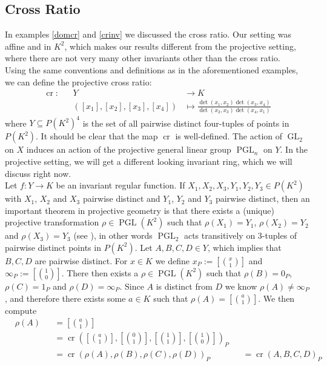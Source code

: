 \subsection{Cross Ratio}
In examples \ref{domcr} and \ref{crinv} we discussed the cross ratio.
Our setting was affine and in $K^2$, which makes our results different from the projective setting, where there are not very many other invariants other than the cross ratio.  \\
Using the same conventions and definitions as in the aforementioned examples, we can define the projective cross ratio:
\begin{equation}
  \begin{aligned}
    \operatorname{cr} \colon&&Y&\longrightarrow K \\
    &&([x_1],[x_2],[x_3],[x_4]) &\longmapsto \frac{\operatorname{det}(x_1,x_2)\operatorname{det}(x_3,x_4)}{\operatorname{det}(x_2,x_3)\operatorname{det}(x_4,x_1)}
  \end{aligned}
\end{equation}
where $Y \subseteq P(K^2)^4$ is the set of all pairwise distinct four-tuples of points in $P(K^2)$.
It should be clear that the map $\operatorname{cr}$ is well-defined.
The action of $\operatorname{GL}_2$ on $X$ induces an action of the projective general linear group $\operatorname{PGL}_n$ on $Y$.
In the projective setting, we will get a different looking invariant ring, which we will discuss right now.  \\
Let $f \colon Y \longrightarrow K$ be an invariant regular function.
If $X_1,X_2,X_3,Y_1,Y_2,Y_3 \in P(K^2)$ with $X_1$, $X_2$ and $X_3$ pairwise distinct and $Y_1$, $Y_2$ and $Y_3$ pairwise distinct, then an important theorem in projective geometry is that there exists a (unique) projective transformation $ \rho \in \operatorname{PGL}(K^2)$ such that $\rho (X_1) = Y_1$, $\rho(X_2) = Y_2$ and $\rho(X_3) = Y_3$ (see \cite[prop 5.6]{Aud03}), in other words $\operatorname{PGL}_2$ acts transitively on $3$-tuples of pairwise distinct points in $P(K^2) $.
Let $A,B,C,D \in Y$, which implies that $B,C,D$ are pairwise distinct.
For $x \in K $ we define $x_P := \left[\binom{x}{1}\right]$ and $\infty_P := \left[\binom{1}{0}\right]$.
There then exists a $\rho \in \operatorname{PGL}(K^2)$ such that $\rho (B) = 0_P$, $\rho (C) = 1_P$ and $\rho (D) = \infty_P$.
Since $A$ is distinct from $D$ we know $\rho (A) \neq \infty_P$, and therefore there exists some $a \in K$ such that $\rho(A) = [\binom{a}{1}]$.
We then compute
\begin{equation}
  \begin{aligned}
    &\rho (A)
    &&= \left[\binom{a}{1}\right]\\
    &&&= \operatorname{cr}\left(\left[\binom{a}{1}\right],\left[\binom{0}{1}\right],\left[\binom{1}{1}\right],\left[\binom{1}{0}\right]\right)_P\\
    &&&= \operatorname{cr}(\rho(A),\rho(B),\rho(C),\rho(D))_P &&= \operatorname{cr}(A,B,C,D)_P
  \end{aligned}
\end{equation}
